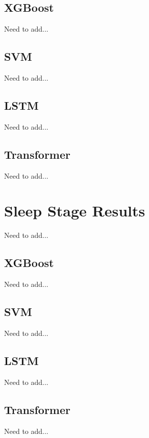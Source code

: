 \documentclass[12pt]{report}
\begin{document}
\subsection{XGBoost}
Need to add...

\subsection{SVM}
Need to add...

\subsection{LSTM}
Need to add...

\subsection{Transformer}
Need to add...

\section{Sleep Stage Results}
Need to add...

\subsection{XGBoost}
Need to add...

\subsection{SVM}
Need to add...

\subsection{LSTM}
Need to add...

\subsection{Transformer}
Need to add...
\end{document}
